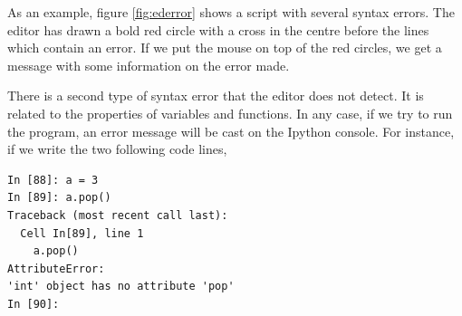 \begin{paracol}{2}
As an example, figure \ref{fig:ederror} shows a script with several syntax errors. The editor has drawn a bold red circle with a cross in the centre before the lines which contain an error. If we put the mouse on top of the red circles, we get a message with some information on the error made.

There is a second type of syntax error that the editor does not detect. It is related to the properties of variables and functions. In any case, if we try to run the program, an error message will be cast on the Ipython console. For instance, if we write the two following code lines, 
\end{paracol}
\begin{center}
    \begin{minipage}{.4\textwidth}
\begin{verbatim}
In [88]: a = 3
In [89]: a.pop()
Traceback (most recent call last):
  Cell In[89], line 1
    a.pop()
AttributeError: 
'int' object has no attribute 'pop'
In [90]:
\end{verbatim}
\end{minipage}
\end{center}

